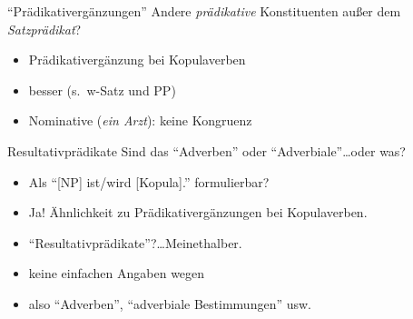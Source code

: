 \begin{frame}
  {"`Prädikativergänzungen"'}
  \pause
  Andere \textit{prädikative} Konstituenten außer dem \textit{Satzprädikat}?\\
  \Halbzeile
  \begin{exe}
    \ex\label{ex:praedikative022}
    \begin{xlist}
      \pause
      \pause
      \pause
    \end{xlist}
  \end{exe}
  \pause
  \Halbzeile
  \begin{itemize}[<+->]
    \item \alert{Prädikativergänzung} bei Kopulaverben
    \item besser  (s.~w-Satz und PP)
    \item Nominative (\textit{ein Arzt}): keine Kongruenz
  \end{itemize}
\end{frame}

\begin{frame}
  {Resultativprädikate}
  \pause
  Sind das "`Adverben"' oder "`Adverbiale"'\ldots oder was?\\
  \Halbzeile
  \pause
  \begin{exe}
    \ex\label{ex:praedikative027}
    \begin{xlist}
    \end{xlist}
  \end{exe}
  \pause
  \begin{itemize}[<+->]
    \item Als \alert{"`[NP] ist\slash wird [Kopula]."'} formulierbar?
    \item \alert{Ja! Ähnlichkeit zu Prädikativergänzungen bei Kopulaverben.}
    \item "`Resultativprädikate"'?\ldots Meinethalber.
    \item keine einfachen Angaben wegen 
    \item also  "`Adverben"', "`adverbiale Bestimmungen"' usw.
  \end{itemize}
\end{frame}

